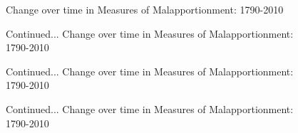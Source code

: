 
    \begin{figure}
        \caption{Change over time in Measures of Malapportionment: 1790-2010}
        \centering
        
        \label{fig:1}
    \end{figure}
    
        \begin{figure}
        \captionsetup{labelformat=empty}
        \caption{Continued... Change over time in Measures of Malapportionment: 1790-2010}
        \centering
        
        \label{fig:1cd}
    \end{figure}
    
    
        \begin{figure}
        \captionsetup{labelformat=empty}
        \caption{Continued... Change over time in Measures of Malapportionment: 1790-2010}
        \centering
        
        \label{fig:1ef}
    \end{figure}
    
    
    \begin{figure}
    \captionsetup{labelformat=empty}
        \caption{Continued... Change over time in Measures of Malapportionment: 1790-2010}
        \centering
        
        \label{fig:1g}
    \end{figure}
    
    \clearpage
 